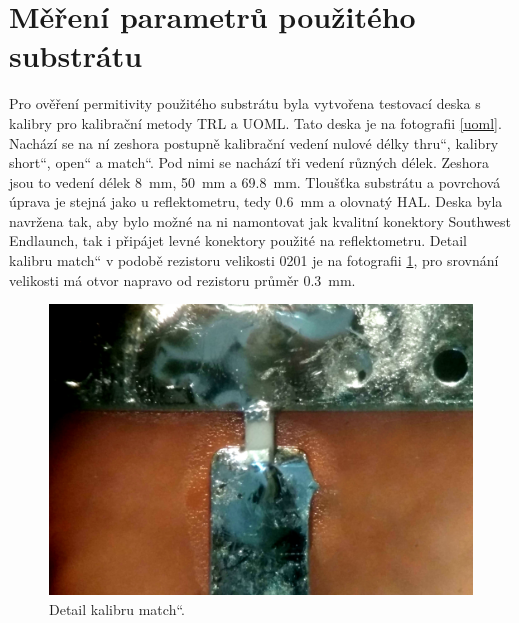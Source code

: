 \section{Měření parametrů použitého substrátu}
Pro ověření permitivity použitého substrátu byla vytvořena testovací deska s kalibry pro kalibrační metody \acrshort{TRL} a \acrshort{UOML}. Tato deska je na fotografii \ref{uoml}. Nachází se na ní zeshora postupně kalibrační vedení nulové délky \quotedblbase thru\textquotedblleft , kalibry \quotedblbase short\textquotedblleft , \quotedblbase open\textquotedblleft{} a \quotedblbase match\textquotedblleft{}. Pod nimi se nachází tři vedení různých délek. Zeshora jsou to vedení délek \SI{8}{\milli\meter}, \SI{50}{\milli\meter} a \SI{69.8}{\milli\meter}. Tloušťka substrátu a povrchová úprava je stejná jako u reflektometru, tedy \SI{0.6}{\milli\meter} a olovnatý HAL. Deska byla navržena tak, aby bylo možné na ni namontovat jak kvalitní konektory Southwest Endlaunch, tak i připájet levné konektory použité na reflektometru. Detail kalibru \quotedblbase match\textquotedblleft{} v podobě rezistoru velikosti 0201 je na fotografii \ref{match_detail}, pro srovnání velikosti má otvor napravo od rezistoru průměr \SI{0.3}{\milli\meter}.
\begin{figure}[htbp]
\includegraphics[width=\textwidth,keepaspectratio]{images/measurements/match.jpg}\caption{Detail kalibru \quotedblbase match\textquotedblleft .}\label{match_detail}
\end{figure}


